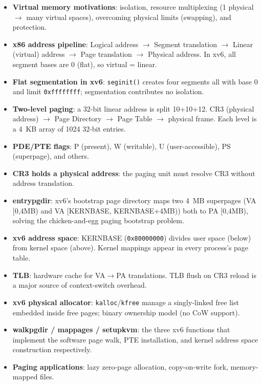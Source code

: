 \documentclass[11pt]{article}
\begin{document}
\begin{itemize}
    \item \textbf{Virtual memory motivations}: isolation, resource multiplexing (1 physical $\to$ many virtual spaces), overcoming physical limits (swapping), and protection.
    \item \textbf{x86 address pipeline}: Logical address $\to$ Segment translation $\to$ Linear (virtual) address $\to$ Page translation $\to$ Physical address. In xv6, all segment bases are 0 (flat), so virtual = linear.
    \item \textbf{Flat segmentation in xv6}: \texttt{seginit()} creates four segments all with base 0 and limit \texttt{0xffffffff}; segmentation contributes no isolation.
    \item \textbf{Two-level paging}: a 32-bit linear address is split 10+10+12. CR3 (physical address) $\to$ Page Directory $\to$ Page Table $\to$ physical frame. Each level is a 4~KB array of 1024 32-bit entries.
    \item \textbf{PDE/PTE flags}: P (present), W (writable), U (user-accessible), PS (superpage), and others.
    \item \textbf{CR3 holds a physical address}: the paging unit must resolve CR3 without address translation.
    \item \textbf{entrypgdir}: xv6's bootstrap page directory maps two 4~MB superpages (VA [0,4MB) and VA [KERNBASE, KERNBASE+4MB)) both to PA [0,4MB), solving the chicken-and-egg paging bootstrap problem.
    \item \textbf{xv6 address space}: KERNBASE (\texttt{0x80000000}) divides user space (below) from kernel space (above). Kernel mappings appear in every process's page table.
    \item \textbf{TLB}: hardware cache for VA$\to$PA translations. TLB flush on CR3 reload is a major source of context-switch overhead.
    \item \textbf{xv6 physical allocator}: \texttt{kalloc}/\texttt{kfree} manage a singly-linked free list embedded inside free pages; binary ownership model (no CoW support).
    \item \textbf{walkpgdir / mappages / setupkvm}: the three xv6 functions that implement the software page walk, PTE installation, and kernel address space construction respectively.
    \item \textbf{Paging applications}: lazy zero-page allocation, copy-on-write fork, memory-mapped files.
\end{itemize}
\end{document}
